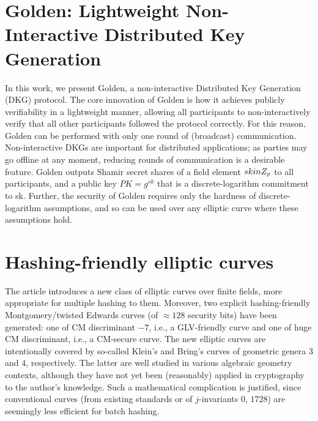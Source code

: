 \documentclass[11pt,oneside]{book}
\theoremstyle{definition}
\theoremstyle{remark}
\theoremstyle{plain}
\begin{document}
\section{\cite{cryptoeprint:2025/1924} Golden: Lightweight Non-Interactive Distributed Key Generation}
In this work, we present Golden, a non-interactive Distributed Key Generation (DKG) protocol. The core innovation of Golden is how it achieves publicly verifiability in a lightweight manner, allowing all participants to non-interactively verify that all other participants followed the protocol correctly. For this reason, Golden can be performed with only one round of (broadcast) communication. Non-interactive DKGs are important for distributed applications; as parties may go offline at any moment, reducing rounds of communication is a desirable feature. Golden outputs Shamir secret shares of a field element $sk \\in Z_p$ to all participants, and a public key $PK= g^{sk}$ that is a discrete-logarithm commitment to sk. Further, the security of Golden requires only the hardness of discrete-logarithm assumptions, and so can be used over any elliptic curve where these assumptions hold.

\section{\cite{cryptoeprint:2025/1926} Hashing-friendly elliptic curves}
The article introduces a new class of elliptic curves over finite fields, more appropriate for multiple hashing to them. Moreover, two explicit hashing-friendly Montgomery/twisted Edwards curves (of $\approx 128$ security bits) have been generated: one of CM discriminant $-7$, i.e., a GLV-friendly curve and one of huge CM discriminant, i.e., a CM-secure curve. The new elliptic curves are intentionally covered by so-called Klein's and Bring's curves of geometric genera $3$ and $4$, respectively. The latter are well studied in various algebraic geometry contexts, although they have not yet been (reasonably) applied in cryptography to the author's knowledge. Such a mathematical complication is justified, since conventional curves (from existing standards or of $j$-invariants $0$, $1728$) are seemingly less efficient for batch hashing.
\end{document}
